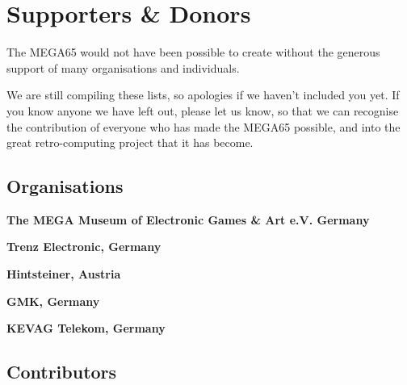 \chapter{Supporters \& Donors}


The MEGA65 would not have been possible to create without the generous support of many organisations and individuals.

We are still compiling these lists, so apologies if we haven't included you yet. If you know anyone we have left out, please let us know, so that we can recognise the contribution of everyone who has made the MEGA65 possible, and into the great retro-computing project that it has become.

\section{Organisations}

{\bf The MEGA Museum of Electronic Games \& Art e.V. Germany} \\

{\bf Trenz Electronic, Germany} \\

{\bf Hintsteiner, Austria} \\

{\bf GMK, Germany} \\

{\bf KEVAG Telekom, Germany} \\

\newpage
\section{Contributors}

